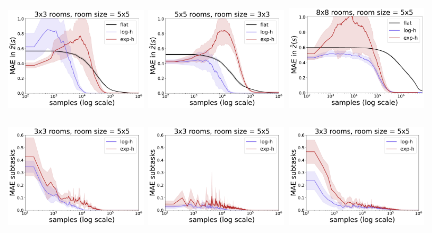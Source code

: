   \begin{figure}
  \centering
  \includegraphics*[width=0.32\textwidth]{figures/chapter2/online/nrooms_3_3.pdf}
  \includegraphics*[width=0.32\textwidth]{figures/chapter2/online/nrooms_5_5.pdf}
  \includegraphics*[width=0.32\textwidth]{figures/chapter2/online/nrooms_8_8.pdf}

  \includegraphics*[width=0.32\textwidth]{figures/chapter2/online/nrooms_3_3_subtasks.pdf}
  \includegraphics*[width=0.32\textwidth]{figures/chapter2/online/nrooms_5_5_subtasks.pdf}
  \includegraphics*[width=0.32\textwidth]{figures/chapter2/online/nrooms_8_8_subtasks.pdf}


\end{figure}
